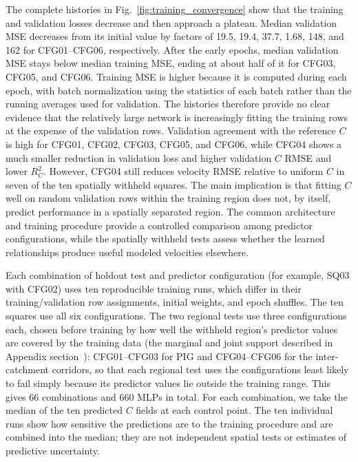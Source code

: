 \documentclass[review,jog]{igs}
\begin{document}
The complete histories in Fig.~\ref{fig:training_convergence} show that the training and validation losses decrease and then approach a plateau. Median validation MSE decreases from its initial value by factors of 19.5, 19.4, 37.7, 1.68, 148, and 162 for CFG01--CFG06, respectively. After the early epochs, median validation MSE stays below median training MSE, ending at about half of it for CFG03, CFG05, and CFG06. Training MSE is higher because it is computed during each epoch, with batch normalization using the statistics of each batch rather than the running averages used for validation. The histories therefore provide no clear evidence that the relatively large network is increasingly fitting the training rows at the expense of the validation rows. Validation agreement with the reference $C$ is high for CFG01, CFG02, CFG03, CFG05, and CFG06, while CFG04 shows a much smaller reduction in validation loss and higher validation $C$ RMSE and lower $R_C^2$. However, CFG04 still reduces velocity RMSE relative to uniform $C$ in seven of the ten spatially withheld squares. The main implication is that fitting $C$ well on random validation rows within the training region does not, by itself, predict performance in a spatially separated region. The common architecture and training procedure provide a controlled comparison among predictor configurations, while the spatially withheld tests assess whether the learned relationships produce useful modeled velocities elsewhere.

Each combination of holdout test and predictor configuration (for example, SQ03 with CFG02) uses ten reproducible training runs, which differ in their training/validation row assignments, initial weights, and epoch shuffles. The ten squares use all six configurations. The two regional tests use three configurations each, chosen before training by how well the withheld region's predictor values are covered by the training data (the marginal and joint support described in Appendix section~): CFG01--CFG03 for PIG and CFG04--CFG06 for the inter-catchment corridors, so that each regional test uses the configurations least likely to fail simply because its predictor values lie outside the training range. This gives 66 combinations and 660 MLPs in total. For each combination, we take the median of the ten predicted $C$ fields at each control point. The ten individual runs show how sensitive the predictions are to the training procedure and are combined into the median; they are not independent spatial tests or estimates of predictive uncertainty.
\end{document}

